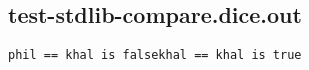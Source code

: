 \subsection{test-stdlib-compare.dice.out}
\begin{verbatim}
phil == khal is falsekhal == khal is true
\end{verbatim}